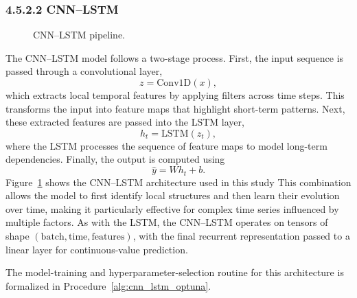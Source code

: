 \documentclass[pdflatex,sn-mathphys-num]{sn-jnl}%
\theoremstyle{thmstyleone}%
\theoremstyle{thmstyletwo}%
\theoremstyle{thmstylethree}%
\begin{document}
\subsubsection*{4.5.2.2 CNN--LSTM}
\begin{figure}[H]
\centering

\caption{CNN--LSTM pipeline.}
\label{fig:cnn_lstm_architecture}
\end{figure}
The CNN--LSTM model follows a two-stage process. First, the input sequence is passed through a convolutional layer,
\begin{equation}
 z = \mathrm{Conv1D}(x),
\label{eq:conv1d}
\end{equation}
which extracts local temporal features by applying filters across time steps. This transforms the input into feature maps that highlight short-term patterns. Next, these extracted features are passed into the LSTM layer,
\begin{equation}
 h_t = \mathrm{LSTM}(z_t),
\label{eq:cnn_lstm}
\end{equation}
where the LSTM processes the sequence of feature maps to model long-term dependencies. Finally, the output is computed using
\begin{equation}
 \hat{y} = W h_t + b.
\label{eq:cnn_lstm_output}
\end{equation}
Figure~\ref{fig:cnn_lstm_architecture} shows the CNN--LSTM architecture used in this study This combination allows the model to first identify local structures and then learn their evolution over time, making it particularly effective for complex time series influenced by multiple factors. As with the LSTM, the CNN--LSTM operates on tensors of shape $(\text{batch}, \text{time}, \text{features})$, with the final recurrent representation passed to a linear layer for continuous-value prediction.

The model-training and hyperparameter-selection routine for this architecture is formalized in Procedure~\ref{alg:cnn_lstm_optuna}.
\end{document}
